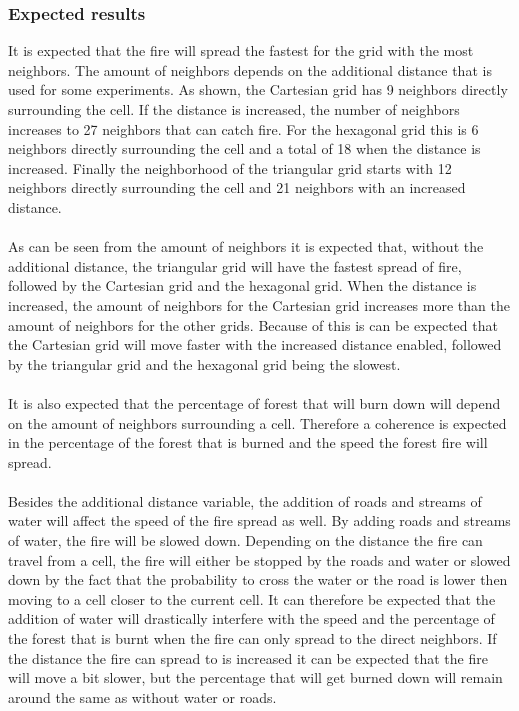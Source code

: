 \documentclass{article}
\begin{document}
\begin{multicols}{2}
\subsubsection*{Expected results}
It is expected that the fire will spread the fastest for the grid with the most neighbors. The amount of neighbors depends on the additional distance that is used for some experiments. As shown, the Cartesian grid has 9 neighbors directly surrounding the cell. If the distance is increased, the number of neighbors increases to 27 neighbors that can catch fire. For the hexagonal grid this is 6 neighbors directly surrounding the cell and a total of 18 when the distance is increased. Finally the neighborhood of the triangular grid starts with 12 neighbors directly surrounding the cell and 21 neighbors with an increased distance.\\\\
As can be seen from the amount of neighbors it is expected that, without the additional distance, the triangular grid will have the fastest spread of fire, followed by the Cartesian grid and the hexagonal grid. When the distance is increased, the amount of neighbors for the Cartesian grid increases more than the amount of neighbors for the other grids. Because of this is can be expected that the Cartesian grid will move faster with the increased distance enabled, followed by the triangular grid and the hexagonal grid being the slowest.\\\\
It is also expected that the percentage of forest that will burn down will depend on the amount of neighbors surrounding a cell. Therefore a coherence is expected in the percentage of the forest that is burned and the speed the forest fire will spread.\\\\
Besides the additional distance variable, the addition of roads and streams of water will affect the speed of the fire spread as well. By adding roads and streams of water, the fire will be slowed down. Depending on the distance the fire can travel from a cell, the fire will either be stopped by the roads and water or slowed down by the fact that the probability to cross the water or the road is lower then moving to a cell closer to the current cell. It can therefore be expected that the addition of water will drastically interfere with the speed and the percentage of the forest that is burnt when the fire can only spread to the direct neighbors. If the distance the fire can spread to is increased it can be expected that the fire will move a bit slower, but the percentage that will get burned down will remain around the same as without water or roads.\\\\

\end{multicols}
\end{document}
